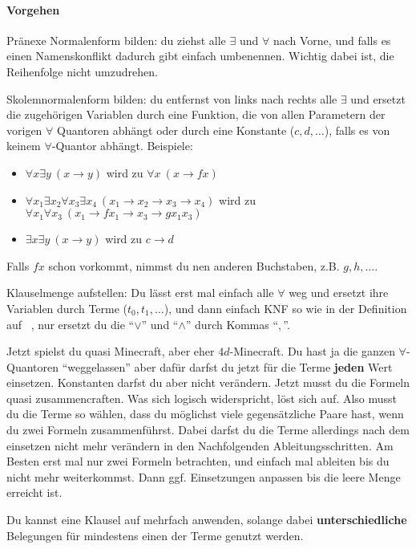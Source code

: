 \documentclass[
    ngerman,
    color=3b,
    summary,
    boxarc,
    main,
    fleqn,
    leqno,
]{rubos-tuda-template}
\begin{document}
    \paragraph{Vorgehen}
    \begin{steps}
        \item Pränexe Normalenform bilden: du ziehst alle $\exists$ und $\forall$ nach Vorne, und falls es einen Namenskonflikt dadurch gibt einfach umbenennen. Wichtig dabei ist, die Reihenfolge nicht umzudrehen.
        \item Skolemnormalenform bilden: du entfernst von links nach rechts alle $\exists$ und ersetzt die zugehörigen Variablen durch eine Funktion, die von allen Parametern der vorigen $\forall$ Quantoren abhängt oder durch eine Konstante ($c,d,\dots$), falls es von keinem $\forall$-Quantor abhängt.
        Beispiele:\begin{itemize}
            \item  $\forall x\exists y~\left(x\rightarrow y\right)$ wird zu $\forall x~\left(x\rightarrow fx\right)$
            \item  $\forall x_1\exists x_2\forall x_3\exists x_4~\left(x_1\rightarrow x_2\rightarrow x_3\rightarrow x_4\right)$ wird zu $\forall x_1\forall x_3~\left(x_1\rightarrow fx_1\rightarrow x_3\rightarrow gx_1x_3\right)$
            \item  $\exists x\exists y~\left(x\rightarrow y\right)$ wird zu $c\rightarrow d$
        \end{itemize} Falls $fx$ schon vorkommt, nimmst du nen anderen Buchstaben, z.B. $g,h,\dots$.
        \item Klauselmenge aufstellen: Du lässt erst mal einfach alle $\forall$ weg und ersetzt ihre Variablen durch Terme ($t_0,t_1,\dots$), und dann einfach KNF so wie in der Definition auf \pagename~\pageref{knf}, nur ersetzt du die \enquote{$\lor$} und \enquote{$\land$} durch Kommas \enquote{$,$}.
        \item Jetzt spielst du quasi Minecraft, aber eher $4d$-Minecraft. Du hast ja die ganzen $\forall$-Quantoren \enquote{weggelassen} aber dafür darfst du jetzt für die Terme \textbf{jeden} Wert einsetzen. Konstanten darfst du aber nicht verändern. Jetzt musst du die Formeln quasi zusammencraften. Was sich logisch widerspricht, löst sich auf. Also musst du die Terme so wählen, dass du möglichst viele gegensätzliche Paare hast, wenn du zwei Formeln zusammenführst. Dabei darfst du die Terme allerdings nach dem einsetzen nicht mehr verändern in den Nachfolgenden Ableitungsschritten. Am Besten erst mal nur zwei Formeln betrachten, und einfach mal ableiten bis du nicht mehr weiterkommst. Dann ggf. Einsetzungen anpassen bis die leere Menge erreicht ist.
    \end{steps}
    \begin{hinweis}
        Du kannst eine Klausel auf mehrfach anwenden, solange dabei \textbf{unterschiedliche} Belegungen für mindestens einen der Terme genutzt werden.
    \end{hinweis}
\end{document}
